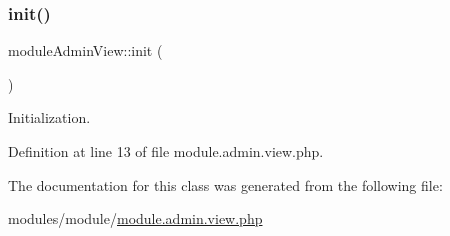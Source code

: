 \hypertarget{classmoduleAdminView_a9b5d1a3f7dc566edd3c5f381e19438b7}{}\label{classmoduleAdminView_a9b5d1a3f7dc566edd3c5f381e19438b7} 
\subsubsection{\texorpdfstring{init()}{init()}}
{\footnotesize\ttfamily module\+Admin\+View\+::init (\begin{DoxyParamCaption}{ }\end{DoxyParamCaption})}



Initialization. 



Definition at line 13 of file module.\+admin.\+view.\+php.



The documentation for this class was generated from the following file\+:\begin{DoxyCompactItemize}
\item 
modules/module/\hyperlink{module_8admin_8view_8php}{module.\+admin.\+view.\+php}\end{DoxyCompactItemize}
